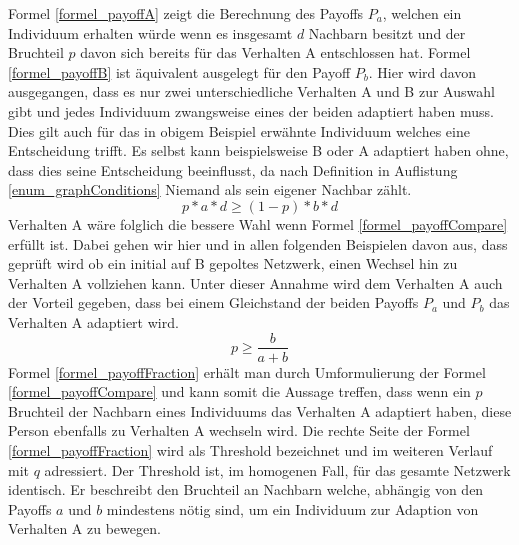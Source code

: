 \documentclass[12pt]{article}
\begin{document}
Formel \ref{formel_payoffA} zeigt die Berechnung des Payoffs $P_a$, welchen ein Individuum erhalten würde wenn es insgesamt $d$ Nachbarn besitzt und der Bruchteil $p$ davon sich bereits für das Verhalten A entschlossen hat. Formel \ref{formel_payoffB} ist äquivalent ausgelegt für den Payoff $P_b$. Hier wird davon ausgegangen, dass es nur zwei unterschiedliche Verhalten A und B zur Auswahl gibt und jedes Individuum zwangsweise eines der beiden adaptiert haben muss. Dies gilt auch für das in obigem Beispiel erwähnte Individuum welches eine Entscheidung trifft. Es selbst kann beispielsweise B oder A adaptiert haben ohne, dass dies seine Entscheidung beeinflusst, da nach Definition in Auflistung \ref{enum_graphConditions} Niemand als sein eigener Nachbar zählt.
  \begin{equation}
 \label{formel_payoffCompare}
 p*a*d \geq (1-p)*b*d
 \end{equation}
Verhalten A wäre folglich die bessere Wahl wenn Formel \ref{formel_payoffCompare} erfüllt ist. Dabei gehen wir hier und in allen folgenden Beispielen davon aus, dass geprüft wird ob ein initial auf B gepoltes Netzwerk, einen Wechsel hin zu Verhalten A vollziehen kann. Unter dieser Annahme wird dem Verhalten A auch der Vorteil gegeben, dass bei einem Gleichstand der beiden Payoffs $P_a$ und $P_b$ das Verhalten A adaptiert wird.
%
  \begin{equation}
 \label{formel_payoffFraction}
 p \geq \frac{b}{a+b}
 \end{equation}
Formel \ref{formel_payoffFraction} erhält man durch Umformulierung der Formel \ref{formel_payoffCompare} und kann somit die Aussage treffen, dass wenn ein $p$ Bruchteil der Nachbarn eines Individuums das Verhalten A adaptiert haben, diese Person ebenfalls zu Verhalten A wechseln wird. Die rechte Seite der Formel \ref{formel_payoffFraction} wird als Threshold bezeichnet und im weiteren Verlauf mit $q$ adressiert. Der Threshold ist, im homogenen Fall, für das gesamte Netzwerk identisch. Er beschreibt den Bruchteil an Nachbarn welche, abhängig von den Payoffs $a$ und $b$ mindestens nötig sind, um ein Individuum zur Adaption von Verhalten A zu bewegen.
\end{document}
